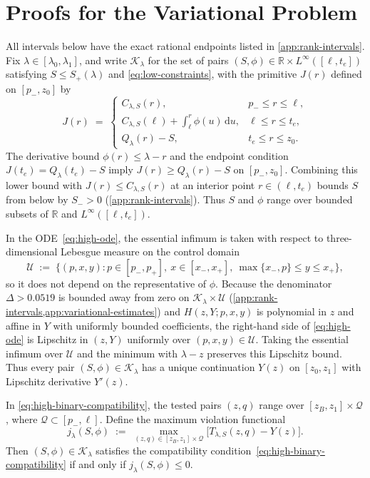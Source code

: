 \documentclass[11pt]{article}
\numberwithin{equation}{section}
\theoremstyle{plain}
\theoremstyle{definition}
\newcommand{\R}{\mathbb{R}}
\newcommand{\1}{\mathbf{1}}
\newcommand{\calK}{\mathcal{K}}
\newcommand{\calQ}{\mathcal{Q}}
\newcommand{\calU}{\mathcal{U}}
\begin{document}
\section{Proofs for the Variational Problem}
\label{app:variational}

All intervals below have the exact rational endpoints listed in \cref{app:rank-intervals}. Fix $\lambda \in [\lambda_0, \lambda_1]$, and write $\calK_\lambda$ for the set of pairs $(S, \phi) \in \R \times L^\infty([\ell, t_e])$ satisfying $S \le S_+(\lambda)$ and \cref{eq:low-constraints}, with the primitive $J(r)$ defined on $[p_-, z_0]$ by
\[
  J(r) \;=\;
  \begin{cases}
    C_{\lambda, S}(r), & p_- \le r \le \ell, \\
    C_{\lambda, S}(\ell) + \displaystyle\int_\ell^r \phi(u)\,\mathrm{d}u, & \ell \le r \le t_e, \\
    Q_\lambda(r) - S, & t_e \le r \le z_0.
  \end{cases}
\]
The derivative bound $\phi(r) \le \lambda - r$ and the endpoint condition $J(t_e) = Q_\lambda(t_e) - S$ imply $J(r) \ge Q_\lambda(r) - S$ on $[p_-, z_0]$. Combining this lower bound with $J(r) \le C_{\lambda, S}(r)$ at an interior point $r \in (\ell, t_e)$ bounds $S$ from below by $S_- > 0$ (\cref{app:rank-intervals}). Thus $S$ and $\phi$ range over bounded subsets of $\R$ and $L^\infty([\ell, t_e])$.

In the ODE~\eqref{eq:high-ode}, the essential infimum is taken with respect to three-dimensional Lebesgue measure on the control domain
\[
  \calU \;:=\; \bigl\{(p, x, y) : p \in [p_-, p_+],\ x \in [x_-, x_+],\ \max\{x_-, p\} \le y \le x_+\bigr\},
\]
so it does not depend on the representative of $\phi$. Because the denominator $\Delta > 0.0519$ is bounded away from zero on $\calK_\lambda \times \calU$ (\cref{app:rank-intervals,app:variational-estimates}) and $H(z, Y; p, x, y)$ is polynomial in $z$ and affine in $Y$ with uniformly bounded coefficients, the right-hand side of \cref{eq:high-ode} is Lipschitz in $(z, Y)$ uniformly over $(p, x, y) \in \calU$. Taking the essential infimum over $\calU$ and the minimum with $\lambda - z$ preserves this Lipschitz bound. Thus every pair $(S, \phi) \in \calK_\lambda$ has a unique continuation $Y(z)$ on $[z_0, z_1]$ with Lipschitz derivative $Y'(z)$.

In \cref{eq:high-binary-compatibility}, the tested pairs $(z, q)$ range over $[z_B, z_1] \times \calQ$, where $\calQ \subset [p_-, \ell]$. Define the maximum violation functional
\begin{equation}
  j_\lambda(S, \phi) \;:=\; \max_{(z, q) \in [z_B, z_1] \times \calQ}\bigl[T_{\lambda, S}(z, q) - Y(z)\bigr].
  \label{eq:j-lambda-def}
\end{equation}
Then $(S, \phi) \in \calK_\lambda$ satisfies the compatibility condition~\eqref{eq:high-binary-compatibility} if and only if $j_\lambda(S, \phi) \le 0$.
\end{document}
